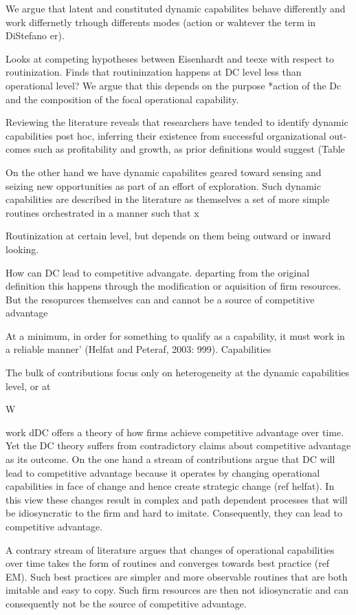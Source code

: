 \documentclass[review,fleqn]{elsarticle}\usepackage[]{graphicx}\usepackage[]{color}
\begin{document}
We argue that latent and constituted dynamic capabilites behave differently and work
differnetly trhough differents modes (action or wahtever the term in DiStefano er). 


Looks at competing hypotheses between Eisenhardt and teexe with respect to routinization. Finds that routininzation happens at DC level less than operational level?
We argue that this depends on the purpose *action of the Dc and the composition of the
focal operational capability. 


Reviewing the literature reveals that researchers have tended to identify dynamic capabilities post hoc, inferring their existence from successful organizational out- comes such as profitability and growth, as prior definitions would suggest (Table

On the other hand we have dynamic capabilites geared toward sensing and seizing new
opportunities as part of an effort of exploration. Such dynamic capabilities are described
in the literature as themselves a set of more simple routines orchestrated in a manner
such that x

Routinization at certain level, but depends on them being outward or inward looking. 

How can DC lead to competitive advangate. departing from the original definition this
happens through the modification or aquisition of firm resources. But the resopurces
themselves can and cannot be a source of competitive advantage


At a minimum, in order for something to qualify as a capability, it must work in a reliable manner’ (Helfat and Peteraf, 2003: 999). Capabilities

The bulk of contributions focus
only on heterogeneity at the dynamic capabilities level, or at

W

work dDC offers a theory of how firms achieve
competitive advantage over time. Yet the DC theory suffers from contradictory claims about
competitive advantage as its outcome. On the one hand a stream of contributions argue that
DC will lead to competitive advantage because it operates by changing operational
capabilities in face of change and hence create strategic change (ref helfat). In this
view these changes result in complex and path dependent processes that will be
idiosyncratic to the firm and hard to imitate. Consequently, they can lead to competitive
advantage.

A contrary stream of literature argues that changes of operational capabilities over time
takes the form of routines and converges towards best practice (ref EM). Such best
practices are simpler and more observable routines that are both imitable and easy to
copy. Such firm resources are then not idiosyncratic and can consequently not be the
source of competitive advantage. 
\end{document}

